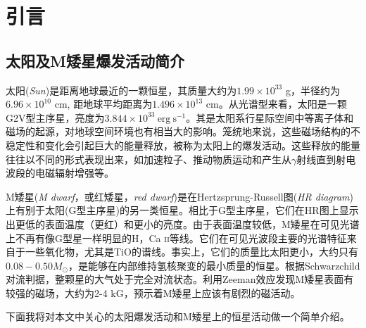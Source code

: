 
\chapter{引言}\label{chap:1}
\section{太阳及M矮星爆发活动简介}
太阳(\textit{Sun})是距离地球最近的一颗恒星，其质量大约为$1.99\times10^{33}$ g，半径约为$6.96\times10^{10}$ cm, 距地球平均距离为$1.496\times10^{13}$ cm\parencite{Stix2004}。从光谱型来看，太阳是一颗G2V型主序星，亮度为$3.844\times10^{33}\ \mathrm{erg}\ \mathrm{s}^{-1}$。其是太阳系行星际空间中等离子体和磁场的起源\parencite{Tu1988}，对地球空间环境也有相当大的影响。笼统地来说，这些磁场结构的不稳定性和变化会引起巨大的能量释放，被称为太阳上的爆发活动\parencite{Stix2004}。这些释放的能量往往以不同的形式表现出来，如加速粒子、推动物质运动和产生从$\gamma$射线直到射电波段的电磁辐射增强等\parencite{Stix2004}。

M矮星(\textit{M dwarf}，或红矮星，\textit{red dwarf})是在Hertzsprung-Russell图(\textit{HR diagram})上有别于太阳(G型主序星)的另一类恒星。相比于G型主序星，它们在HR图上显示出更低的表面温度（更红）和更小的亮度。由于表面温度较低，M矮星在可见光谱上不再有像G型星一样明显的H，Ca \textsc{ii}等线。它们在可见光波段主要的光谱特征来自于一些氧化物，尤其是TiO的谱线\parencite{pols2011}。事实上，它们的质量比太阳更小，大约只有$0.08-0.50M_{\odot}$，是能够在内部维持氢核聚变的最小质量的恒星。根据Schwarzchild对流判据，整颗星的大气处于完全对流状态。\textcite{Johns-Krull1996}利用Zeeman效应发现M矮星表面有较强的磁场，大约为2-4 kG，预示着M矮星上应该有剧烈的磁活动。

下面我将对本文中关心的太阳爆发活动和M矮星上的恒星活动做一个简单介绍。

